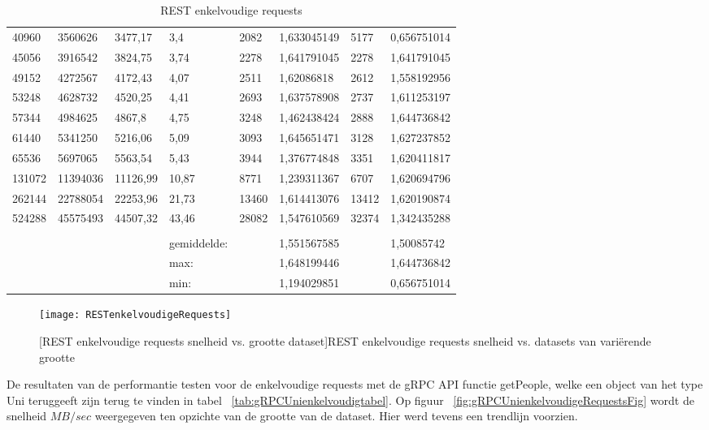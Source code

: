 \begin{table}
\begin{tabular}{llllllll}
        40960 & 3560626 & 3477,17 & 3,4 & 2082 & 1,633045149 & 5177 & 0,656751014 \\
        45056 & 3916542 & 3824,75 & 3,74 & 2278 & 1,641791045 & 2278 & 1,641791045 \\
        49152 & 4272567 & 4172,43 & 4,07 & 2511 & 1,62086818 & 2612 & 1,558192956 \\
        53248 & 4628732 & 4520,25 & 4,41 & 2693 & 1,637578908 & 2737 & 1,611253197 \\
        57344 & 4984625 & 4867,8 & 4,75 & 3248 & 1,462438424 & 2888 & 1,644736842 \\
        61440 & 5341250 & 5216,06 & 5,09 & 3093 & 1,645651471 & 3128 & 1,627237852 \\
        65536 & 5697065 & 5563,54 & 5,43 & 3944 & 1,376774848 & 3351 & 1,620411817 \\
        131072 & 11394036 & 11126,99 & 10,87 & 8771 & 1,239311367 & 6707 & 1,620694796 \\
        262144 & 22788054 & 22253,96 & 21,73 & 13460 & 1,614413076 & 13412 & 1,620190874 \\
        524288 & 45575493 & 44507,32 & 43,46 & 28082 & 1,547610569 & 32374 & 1,342435288 \\
         &  &  &  &  &  &  &  \\
         &  &  & gemiddelde: &  & 1,551567585 &  & 1,50085742 \\
         &  &  & max: &  & 1,648199446 &  & 1,644736842 \\
         &  &  & min: &  & 1,194029851 &  & 0,656751014 \\
        \bottomrule
    \end{tabular}
    \caption{REST enkelvoudige requests}
    \label{tab:RESTenkelvoudigtabel}
\end{table}


\begin{figure}[ht]
    \centering
    \texttt{[image: RESTenkelvoudigeRequests]}
    \caption{[REST enkelvoudige requests snelheid vs. grootte dataset]REST enkelvoudige requests snelheid vs. datasets van vari\"erende grootte}
    \label{fig:RESTenkelvoudigeRequestsFig}
\end{figure}

De resultaten van de performantie testen voor de enkelvoudige requests met de gRPC API functie getPeople, welke een object van het type Uni teruggeeft zijn
terug te vinden in tabel ~\ref{tab:gRPCUnienkelvoudigtabel}.
Op figuur ~\ref{fig:gRPCUnienkelvoudigeRequestsFig} wordt de snelheid \(MB/sec\) weergegeven ten opzichte van de grootte van de dataset. Hier werd tevens een trendlijn voorzien.


